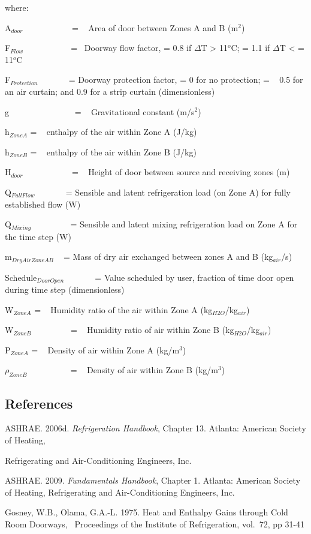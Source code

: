 where:

A\(_{door}\)~~~~~~~~~~~ = ~ Area of door between Zones A and B (m\(^{2}\))

F\(_{Flow}\) ~~~~~~~~~~ = ~Doorway flow factor, = 0.8 if $\Delta$T \textgreater{} 11\(^{o}\)C; = 1.1 if $\Delta$T \textless{} = 11\(^{o}\)C

F\(_{Protection}\) ~~~~~~ = Doorway protection factor, = 0 for no protection; = ~ 0.5 for an air curtain; and 0.9 for a strip curtain (dimensionless)

g~~~~~~~~~~~~~~~ = ~ Gravitational constant (m/s\(^{2}\))

h\(_{ZoneA}\) = ~ enthalpy of the air within Zone A (J/kg)

h\(_{ZoneB}\) = ~ enthalpy of the air within Zone B (J/kg)

H\(_{door}\)~~~~~~~~~~~ = ~ Height of door between source and receiving zones (m)

Q\(_{FullFlow}\) ~~~~~~ = Sensible and latent refrigeration load (on Zone A) for fully established flow (W)

Q\(_{Mixing}\) ~~~~~~~~ = Sensible and latent mixing refrigeration load on Zone A for the time step (W)

m\(_{DryAirZoneAB}\) ~ = Mass of dry air exchanged between zones A and B (kg\(_{air}\)/s)

Schedule\(_{DoorOpen}\) ~~~~~~ = Value scheduled by user, fraction of time door open during time step (dimensionless)

W\(_{ZoneA}\) = ~ Humidity ratio of the air within Zone A (kg\(_{H2O}\)/kg\(_{air}\))

W\(_{ZoneB}\) ~~~~~~~~ = ~ Humidity ratio of air within Zone B (kg\(_{H2O}\)/kg\(_{air}\))

P\(_{ZoneA}\) = ~ Density of air within Zone A (kg/m\(^{3}\))

\(\rho_{ZoneB}\) ~~~~~~~~~ = ~ Density of air within Zone B (kg/m\(^{3}\))

\subsection{References}\label{references-201709281619}

ASHRAE. 2006d. \emph{Refrigeration Handbook}, Chapter 13. Atlanta: American Society of Heating,

Refrigerating and Air-Conditioning Engineers, Inc.

ASHRAE. 2009. \emph{Fundamentals Handbook}, Chapter 1. Atlanta: American Society of Heating, Refrigerating and Air-Conditioning Engineers, Inc.

Gosney, W.B., Olama, G.A.-L. 1975. Heat and Enthalpy Gains through Cold Room Doorways,~ Proceedings of the Institute of Refrigeration, vol.~72, pp 31-41
